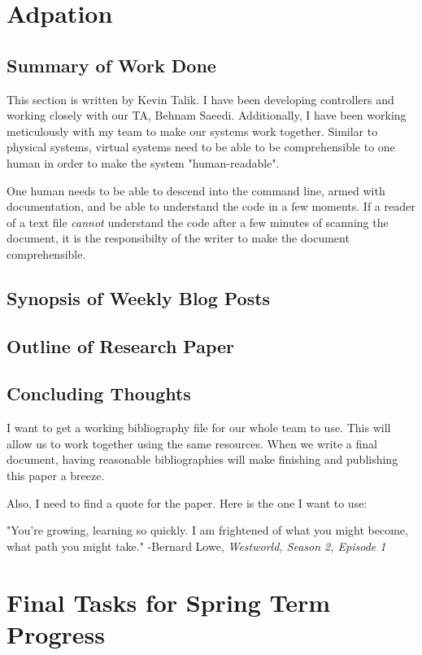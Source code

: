\documentclass[onecolumn, draftclsnofoot,10pt, compsoc]{IEEEtran}
\begin{document}
\section{Adpation}
\subsection{Summary of Work Done}
 This section is written by Kevin Talik. I have been developing controllers and working closely with our TA, Behnam Saeedi. Additionally, I have been working meticulously with my team to make our systems work together. Similar to physical systems, virtual systems need to be able to be comprehensible to one human in order to make the system "human-readable".

 One human needs to be able to descend into the command line, armed with documentation, and be able to understand the code in a few moments. If a reader of a text file \textit{cannot} understand the code after a few minutes of scanning the document, it is the responsibilty of the writer to make the document comprehensible.
 \subsection{Synopsis of Weekly Blog Posts}


\subsection{Outline of Research Paper}
\subsection{Concluding Thoughts}
 I want to get a working bibliography file for our whole team to use. This will allow us to work together using the same resources. When we write a final document, having reasonable bibliographies will make finishing and publishing this paper a breeze.


 Also, I need to find a quote for the paper. Here is the one I want to use:


 \begin{displayquote}
	 "You're growing, learning so quickly. I am frightened of what you might become, what path you might take."
	 -Bernard Lowe, \textit{Westworld, Season 2, Episode 1}
 \end{displayquote}




\section{Final Tasks for Spring Term Progress}
\end{document}
